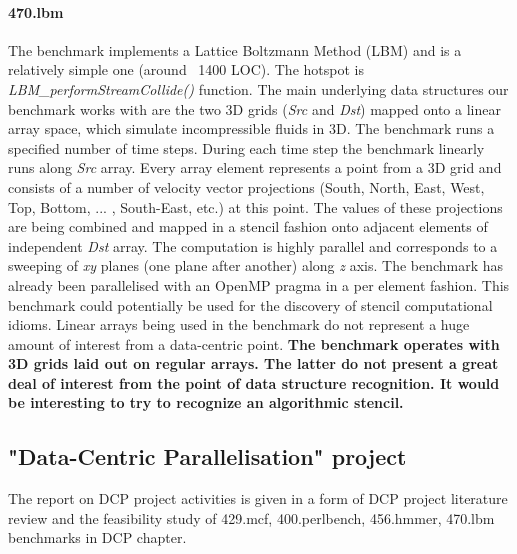 \documentclass[10pt,a4paper]{report}
\begin{document}
\paragraph{470.lbm} The benchmark implements a Lattice Boltzmann Method (LBM) and is a relatively simple one (around ~1400 LOC). The hotspot is \textit{LBM\_performStreamCollide()} function. The main underlying data structures our benchmark works with are the two 3D grids (\textit{Src} and \textit{Dst}) mapped onto a linear array space, which simulate incompressible fluids in 3D. The benchmark runs a specified number of time steps. During each time step the benchmark linearly runs along \textit{Src} array. Every array element represents a point from a 3D grid and consists of a number of velocity vector projections (South, North, East, West, Top, Bottom,  ... , South-East, etc.) at this point. The values of these projections are being combined and mapped in a stencil fashion onto adjacent elements of independent \textit{Dst} array. The computation is highly parallel and corresponds to a sweeping of \textit{xy} planes (one plane after another) along \textit{z} axis. The benchmark has already been parallelised with an OpenMP pragma in a per element fashion. This benchmark could potentially be used for the discovery of stencil computational idioms. Linear arrays being used in the benchmark do not represent a huge amount of interest from a data-centric point.\newline\null
\quad\textbf{The benchmark operates with 3D grids laid out on regular arrays. The latter do not present a great deal of interest from the point of data structure recognition. It would be interesting to try to recognize an algorithmic stencil.}



































\subsection{"Data-Centric Parallelisation" project}
\quad The report on DCP project activities is given in a form of DCP project literature review and the feasibility study of 429.mcf, 400.perlbench, 456.hmmer, 470.lbm benchmarks in DCP chapter.
\end{document}
